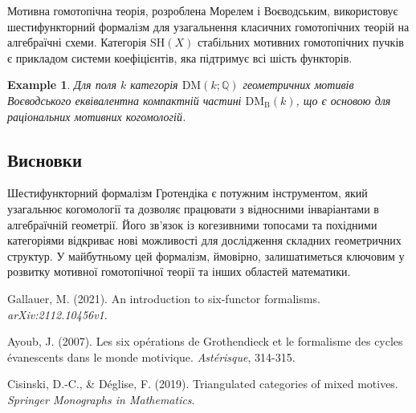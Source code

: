 \documentclass{article}
\theoremstyle{plain}
\newtheorem{example}{Example}
\theoremstyle{definition}
\begin{document}
Мотивна гомотопічна теорія, розроблена Морелем і Воєводським, використовує шестифункторний формалізм для узагальнення класичних гомотопічних теорій на алгебраїчні схеми. Категорія \( \mathrm{SH}(X) \) стабільних мотивних гомотопічних пучків є прикладом системи коефіцієнтів, яка підтримує всі шість функторів.

\begin{example}
Для поля \( k \) категорія \( \mathrm{DM}(k; \mathbb{Q}) \) геометричних мотивів Воєводського еквівалентна компактній частині \( \mathrm{DM}_\mathrm{B}(k) \), що є основою для раціональних мотивних когомологій.
\end{example}

\subsection{Висновки}

Шестифункторний формалізм Гротендіка є потужним інструментом, який узагальнює когомології та дозволяє працювати з відносними інваріантами в алгебраїчній геометрії. Його зв’язок із когезивними топосами та похідними категоріями відкриває нові можливості для дослідження складних геометричних структур. У майбутньому цей формалізм, ймовірно, залишатиметься ключовим у розвитку мотивної гомотопічної теорії та інших областей математики.

\begin{thebibliography}{9}
Gallauer, M. (2021). An introduction to six-functor formalisms. \textit{arXiv:2112.10456v1}.

Ayoub, J. (2007). Les six opérations de Grothendieck et le formalisme des cycles évanescents dans le monde motivique. \textit{Astérisque}, 314-315.

Cisinski, D.-C., \& Déglise, F. (2019). Triangulated categories of mixed motives. \textit{Springer Monographs in Mathematics}.
\end{thebibliography}
\end{document}

